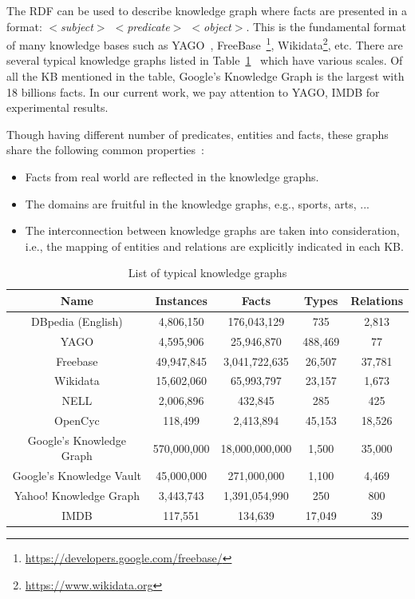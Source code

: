 The RDF can be used to describe knowledge graph where facts are presented in a format: \textit{$<$subject$>$ $<$predicate$>$ $<$object$>$}. This is the fundamental format of many knowledge bases such as YAGO~\cite{ref28}, FreeBase~\footnote{\url{https://developers.google.com/freebase/}}, Wikidata\footnote{\url{https://www.wikidata.org}}, etc. There are several typical knowledge graphs listed in Table~\ref{table1}~\cite{ref27} which have various scales. Of all the KB mentioned in the table, Google's Knowledge Graph is the largest with 18 billions facts. In our current work, we pay attention to YAGO, IMDB for experimental results.

Though having different number of predicates, entities and facts, these graphs share the following common properties~\cite{ref27}:

\begin{itemize}
\item Facts from real world are reflected in the knowledge graphs.
\item The domains are fruitful in the knowledge graphs, e.g., sports, arts, ...
\item The interconnection between knowledge graphs are taken into consideration, i.e., the mapping of entities and relations are explicitly indicated in each KB.
\end{itemize}

\begin{table}
\begin{center}
\begin{tabular}{|c|c|c|c|c|}
\hline
Name & Instances & Facts & Types & Relations\\
\hline\hline
DBpedia (English) & 4,806,150 & 176,043,129 & 735 & 2,813\\
\hline
YAGO & 4,595,906 & 25,946,870 & 488,469 & 77\\
\hline
Freebase & 49,947,845 & 3,041,722,635 & 26,507 & 37,781\\
\hline
Wikidata & 15,602,060 & 65,993,797 & 23,157 & 1,673\\
\hline
NELL & 2,006,896 & 432,845 & 285 & 425\\
\hline
OpenCyc & 118,499 & 2,413,894 & 45,153 & 18,526\\
\hline
Google's Knowledge Graph & 570,000,000 & 18,000,000,000 & 1,500 & 35,000\\
\hline
Google's Knowledge Vault & 45,000,000 & 271,000,000 & 1,100 & 4,469\\
\hline
Yahoo! Knowledge Graph & 3,443,743 & 1,391,054,990 & 250 & 800\\
\hline
IMDB & 117,551 & 134,639 & 17,049 & 39 \\
\hline
\end{tabular}
\end{center}
\caption{List of typical knowledge graphs}
\label{table1}
\end{table}

